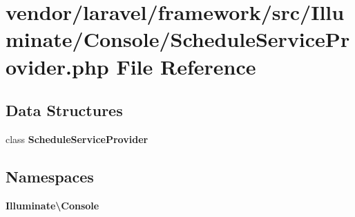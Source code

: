 \section{vendor/laravel/framework/src/\+Illuminate/\+Console/\+Schedule\+Service\+Provider.php File Reference}
\label{_schedule_service_provider_8php}
\subsection*{Data Structures}
\begin{DoxyCompactItemize}
\item 
class {\bf Schedule\+Service\+Provider}
\end{DoxyCompactItemize}
\subsection*{Namespaces}
\begin{DoxyCompactItemize}
\item 
 {\bf Illuminate\textbackslash{}\+Console}
\end{DoxyCompactItemize}
